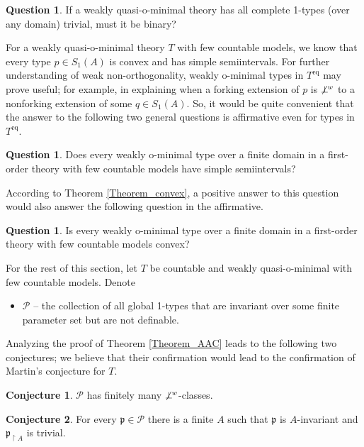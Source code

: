\documentclass{amsart}
\theoremstyle{definition}
\theoremstyle{definition}
\newtheorem{Conjecture}{Conjecture}
\newtheorem{Question}[Theorem]{Question}
\def\strok{\restriction}
\newcommand{\nwor}{\not\perp\hspace*{-0.4em}^{\mathit w}}
\begin{document}
\begin{Question}
If a weakly quasi-o-minimal theory has all complete 1-types (over any domain) trivial, must it be binary?
\end{Question}

 
For a weakly quasi-o-minimal theory $T$ with few countable models, we know that every type $p\in S_1(A)$ is convex and has simple semiintervals. For further understanding of weak non-orthogonality, weakly o-minimal types in $T^\mathrm{eq}$ may prove useful; for example, in explaining when a forking extension of $p$ is $\nwor$ to a nonforking extension of some $q\in S_1(A)$. So, it would be quite convenient that the answer to the following two general questions is affirmative even for types in $T^\mathrm{eq}$. 

\begin{Question}\label{Question_womtype has simple ssi}
Does every weakly o-minimal type over a finite domain in a first-order theory with few countable models have simple semiintervals?
\end{Question}

According to Theorem \ref{Theorem_convex}, a positive answer to this question would also answer the following question in the affirmative.

\begin{Question}\label{Question is wom type convex}
Is every weakly o-minimal type over a finite domain in a first-order theory with few countable models convex?    
\end{Question}





For the rest of this section, let $T$ be countable and weakly quasi-o-minimal with few countable models. Denote
\begin{itemize}
    \item[ ] $\mathcal P$ -- the collection of all global 1-types that are invariant over some finite parameter set but are not definable.
\end{itemize}
Analyzing the proof of Theorem \ref{Theorem_AAC} leads to the following two conjectures; we believe that their confirmation would lead to the confirmation of Martin's conjecture for $T$.  

\begin{Conjecture}
$\mathcal P$ has finitely many $\nwor$-classes.    
\end{Conjecture}


\begin{Conjecture}\label{C2}
For every $\mathfrak p\in\mathcal P$ there is a finite $A$ such that $\mathfrak p$ is $A$-invariant and $\mathfrak p_{\strok A}$ is trivial.
\end{Conjecture}
 
\end{document}
